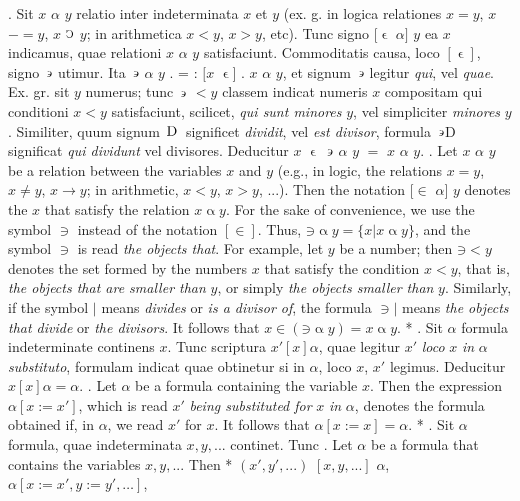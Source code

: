 \documentclass{book}
\newcommand{\C}{\mathop{\sbox0{$\displaystyle$$\reflectbox{C}$} %
\raisebox{-\height+\ht0-0.05cm}[\ht0][\dp0]{\scalebox{0.8}[0.8]{\copy0}}}\displaylimits} %
\newcommand{\such}{\thinspace \rotatebox[origin=c]{180}{$\epsilon$}}
\newcommand{\smallIn}{\ensuremath{\mathrel{\epsilon}}}
\newcommand{\D}{\mathop{\thinspace \text{D} \thinspace}}
\newenvironment{translateTwoCol}
               { %
                 \columnratio{0.5, 0.5} \begin{paracol}{2}
                 \newcommand{\LAT}{\switchcolumn[0]*}
                 \newcommand{\ENG}{\switchcolumn[1]}
               }
               { %
                 \let\ENG\undefined
                 \let\LAT\undefined
                 \end{paracol}
               }
\begin{document}
\begin{translateTwoCol}
. Sit $x$ $\alpha$ $y$ relatio inter indeterminata $x$ et $y$ (ex. g. in logica relationes $x = y$, $x$ $- = y$, $x$ $\C$ $y$; in arithmetica $x < y$, $x > y$, etc). Tunc signo $[\smallIn$ $\alpha]$ $y$ ea $x$ indicamus, quae relationi $x$ $\alpha$ $y$ satisfaciunt. Commoditatis causa, loco $[\smallIn]$, signo $\such$ utimur. Ita $\such$ $\alpha$ $y$ . = : $[x$ $\smallIn ]$ . $x$ $\alpha$ $y$, et signum $\such$ legitur \emph{qui}, vel \emph{quae}. Ex. gr. sit $y$ numerus; tunc $\such$ $< y$ classem indicat numeris $x$ compositam qui conditioni $x<y$ satisfaciunt, scilicet, \emph{qui sunt minores} $y$, vel simpliciter \emph{minores} $y$. Similiter, quum signum $\D$ significet \emph{dividit}, vel \emph{est divisor}, formula $\such$D significat \emph{qui dividunt} vel {divisores}. Deducitur $x$ $\smallIn$ $\such$ $\alpha$ $y$ $=$ $x$ $\alpha$ $y$.
\ENG
{}. Let $x$ $\alpha$ $y$ be a relation between the variables $x$ and $y$ (e.g., in logic, the relations $x = y$, $x \not= y$, $x \rightarrow y$; in arithmetic, $x < y$, $x > y$, ...). Then the notation $[\in$ $\alpha]$ $y$ denotes the $x$ that satisfy the relation $x \mathbin{\alpha} y$. For the sake of convenience, we use the symbol $\ni$ instead of the notation $[\in]$. Thus, $\mathord{\ni} \mathbin{\alpha} y = \{ x | x \mathbin{\alpha} y \}$, and the symbol $\ni$ is read \emph{the objects that}. For example, let $y$ be a number; then $\mathord{\ni} < y$ denotes the set formed by the numbers $x$ that satisfy the condition $x<y$, that is, \emph{the objects that are smaller than} $y$, or simply \emph{the objects smaller than} $y$. Similarly, if the symbol $|$ means \emph{divides} or \emph{is a divisor of}, the formula $\ni|$ means \emph{the objects that divide} or \emph{the divisors}. It follows that $x \in (\mathord{\ni} \mathbin{\alpha} y) = x \mathbin{\alpha} y$.   %
\LAT
{}. Sit $\alpha$ formula indeterminate continens $x$. Tunc scriptura $x' [x] \alpha$, quae legitur $x'$ \emph{loco} $x$ \emph{in} $\alpha$ \emph{substituto}, formulam indicat quae obtinetur si in $\alpha$, loco $x$, $x'$ legimus. Deducitur $x [x] \alpha = \alpha$.
\ENG
{}. Let $\alpha$ be a formula containing the variable $x$. Then the expression $\alpha [ x := x' ]$, which is read $x'$ \emph{being substituted for} $x$ \emph{in} $\alpha$, denotes the formula obtained if, in $\alpha$, we read $x'$ for $x$. It follows that $\alpha[x := x] = \alpha$.
\LAT
{}. Sit $\alpha$ formula, quae indeterminata $x,y,...$ continet. Tunc
\ENG
{}. Let $\alpha$ be a formula that contains the variables $x,y,...$ Then
\LAT
\hspace{1.06cm} $(x',y',...)$ $[x,y,...]$ $\alpha$,
\ENG
\hspace{1.06cm} $\alpha[x:=x', y:=y', \ldots]$,
\end{translateTwoCol}
\end{document}

